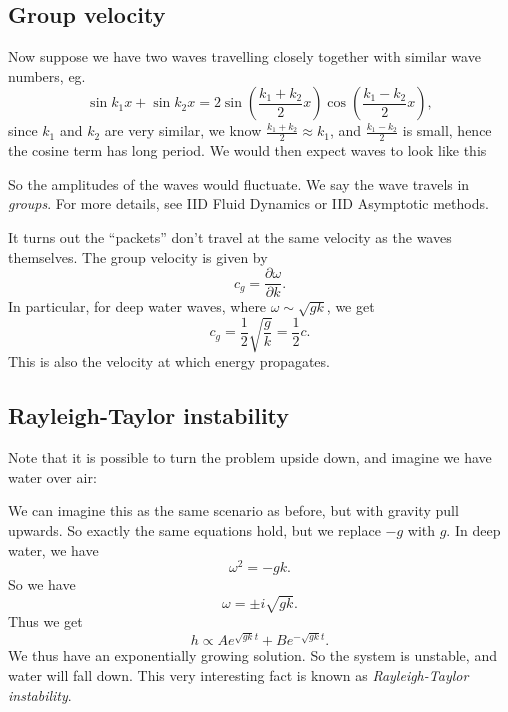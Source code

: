 \documentclass[a4paper]{article}
\begin{document}
\subsection{Group velocity}
Now suppose we have two waves travelling closely together with similar wave numbers, eg.
\[
  \sin k_1 x + \sin k_2 x = 2 \sin \left(\frac{k_1 + k_2}{2} x\right) \cos\left(\frac{k_1 - k_2}{2}x\right),
\]
since $k_1$ and $k_2$ are very similar, we know $\frac{k_1 + k_2}{2} \approx k_1$, and $\frac{k_1 - k_2}{2}$ is small, hence the cosine term has long period. We would then expect waves to look like this
\begin{center}
\end{center}
So the amplitudes of the waves would fluctuate. We say the wave travels in \emph{groups}. For more details, see IID Fluid Dynamics or IID Asymptotic methods.

It turns out the ``packets'' don't travel at the same velocity as the waves themselves. The group velocity is given by
\[
  c_g = \frac{\partial \omega}{\partial k}.
\]
In particular, for deep water waves, where $\omega \sim \sqrt{gk}$, we get
\[
  c_g = \frac{1}{2} \sqrt{\frac{g}{k}} = \frac{1}{2}c.
\]
This is also the velocity at which energy propagates.

\subsection{Rayleigh-Taylor instability}
Note that it is possible to turn the problem upside down, and imagine we have water over air:
\begin{center}
\end{center}
We can imagine this as the same scenario as before, but with gravity pull upwards. So exactly the same equations hold, but we replace $-g$ with $g$. In deep water, we have
\[
  \omega^2 = -gk.
\]
So we have
\[
  \omega = \pm i\sqrt{gk}.
\]
Thus we get
\[
  h \propto A e^{\sqrt{gk} t} + B e^{-\sqrt{gk}t}.
\]
We thus have an exponentially growing solution. So the system is unstable, and water will fall down. This very interesting fact is known as \emph{Rayleigh-Taylor instability}.
\end{document}
